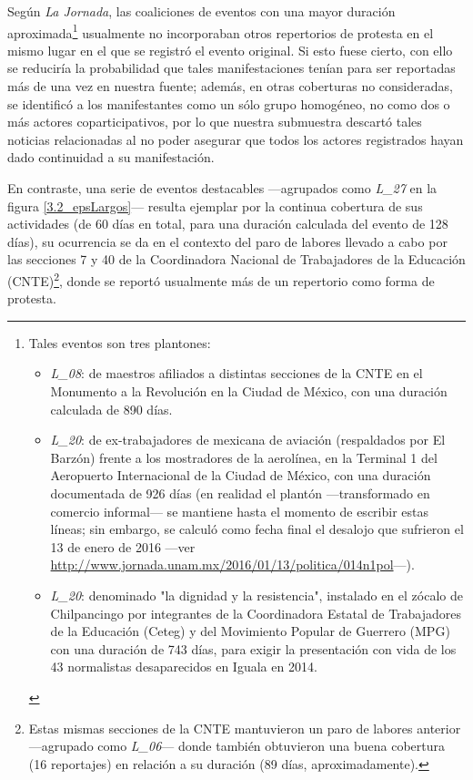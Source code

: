 \documentclass[letterpaper, 11pt]{book}
\theoremstyle{definition}
\theoremstyle{remark}
\begin{document}
Según \emph{La Jornada}, las coaliciones de eventos con una mayor duración aproximada\footnote{
    Tales eventos son tres plantones: 
    \begin{itemize}
    \setlength\itemsep{0.1em}
    \item \emph{L\_08}: de maestros afiliados a distintas secciones de la CNTE en el Monumento a la Revolución en la Ciudad de México, con una duración calculada de 890 días. 
    
    \item \emph{L\_20}: de ex-trabajadores de mexicana de aviación (respaldados por El Barzón) frente a los mostradores de la aerolínea, en la Terminal 1 del Aeropuerto Internacional de la Ciudad de México, con una duración documentada de 926 días (en realidad el plantón ---transformado en comercio informal--- se mantiene hasta el momento de escribir estas líneas; sin embargo, se calculó como fecha final el desalojo que sufrieron el 13 de enero de 2016 ---ver \url{http://www.jornada.unam.mx/2016/01/13/politica/014n1pol}---). 
    
    \item \emph{L\_20}: denominado "la dignidad y la resistencia", instalado en el zócalo de Chilpancingo por integrantes de la Coordinadora Estatal de Trabajadores de la Educación (Ceteg) y del Movimiento Popular de Guerrero (MPG) con una duración de 743 días, para exigir la presentación con vida de los 43 normalistas desaparecidos en Iguala en 2014.
    \end{itemize}
} 
usualmente no incorporaban otros repertorios de protesta en el mismo lugar en el que se registró el evento original. 
Si esto fuese cierto, con ello se reduciría la probabilidad que tales manifestaciones tenían para ser reportadas más de una vez en nuestra fuente; además, en otras coberturas no consideradas, se identificó a los manifestantes como un sólo grupo homogéneo, no como dos o más actores coparticipativos, por lo que nuestra submuestra descartó tales noticias relacionadas al no poder asegurar que todos los actores registrados hayan dado continuidad a su manifestación. 


En contraste, una serie de eventos destacables ---agrupados como \emph{L\_27} en la figura \ref{3.2_epsLargos}--- resulta ejemplar por la continua cobertura de sus actividades (de 60 días en total, para una duración calculada del evento de 128 días), su ocurrencia se da en el contexto del paro de labores llevado a cabo por las secciones 7 y 40 de la Coordinadora Nacional de Trabajadores de la Educación (CNTE)\footnote{
    Estas mismas secciones de la CNTE mantuvieron un paro de labores anterior ---agrupado como \emph{L\_06}--- donde también obtuvieron una buena cobertura (16 reportajes) en relación a su duración (89 días, aproximadamente).
}, 
donde se reportó usualmente más de un repertorio como forma de protesta. 
\end{document}
